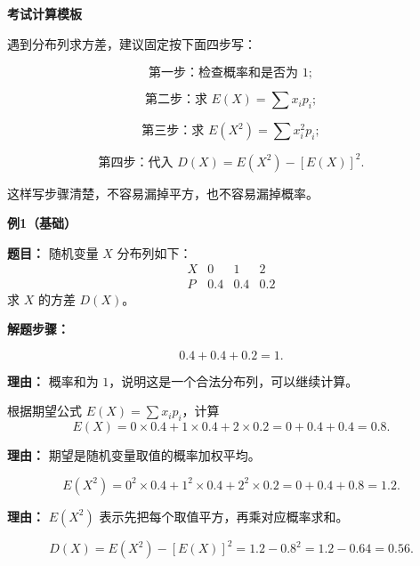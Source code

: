 \begin{examplebox}
	\textbf{\textcolor{CExample}{考试计算模板}}

	遇到分布列求方差，建议固定按下面四步写：

	\[
		\text{第一步：检查概率和是否为 }1;
	\]

	\[
		\text{第二步：求 }E(X)=\sum x_ip_i;
	\]

	\[
		\text{第三步：求 }E(X^2)=\sum x_i^2p_i;
	\]

	\[
		\text{第四步：代入 }D(X)=E(X^2)-[E(X)]^2.
	\]

	这样写步骤清楚，不容易漏掉平方，也不容易漏掉概率。

	\medskip

	\textbf{\textcolor{CExample}{例1（基础）}}

	\textbf{\textcolor{CExample}{题目：}}
	随机变量 $X$ 分布列如下：
	\[
		\begin{array}{c|ccc}
			X & 0   & 1   & 2   \\
			\hline
			P & 0.4 & 0.4 & 0.2
		\end{array}
	\]
	求 $X$ 的方差 $D(X)$。

	\textbf{\textcolor{CExample}{解题步骤：}}

	\begin{description}[style=nextline, leftmargin=2.8em, labelsep=0.5em, itemsep=0.45em]
		\item[\textbf{第一步（检查概率）：}]
		      \[
			      0.4+0.4+0.2=1.
		      \]

		      \par\textbf{理由：}
		      概率和为 $1$，说明这是一个合法分布列，可以继续计算。

		\item[\textbf{第二步（求期望）：}]
		      根据期望公式 $E(X)=\sum x_ip_i$，计算
		      \[
			      E(X)=0\times0.4+1\times0.4+2\times0.2
			      =0+0.4+0.4=0.8.
		      \]

		      \par\textbf{理由：}
		      期望是随机变量取值的概率加权平均。

		\item[\textbf{第三步（求平方期望）：}]
		      \[
			      E(X^2)=0^2\times0.4+1^2\times0.4+2^2\times0.2
			      =0+0.4+0.8=1.2.
		      \]

		      \par\textbf{理由：}
		      $E(X^2)$ 表示先把每个取值平方，再乘对应概率求和。

		\item[\textbf{第四步（代入公式）：}]
		      \[
			      D(X)=E(X^2)-[E(X)]^2=1.2-0.8^2=1.2-0.64=0.56.
		      \]


\end{description}
\end{examplebox}
